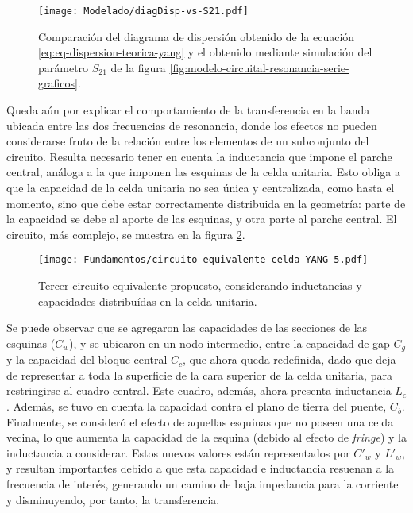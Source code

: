 \begin{figure}[h]
	\centering
	\texttt{[image: Modelado/diagDisp-vs-S21.pdf]}
	\caption{Comparación del diagrama de dispersión obtenido de la ecuación \ref{eq:eq-dispersion-teorica-yang} y el obtenido mediante simulación del parámetro $S_{21}$ de la figura \ref{fig:modelo-circuital-resonancia-serie-graficos}.}
	\label{fig:diagDisp-vs-S21}
\end{figure}


Queda aún por explicar el comportamiento de la transferencia en la banda ubicada entre las dos frecuencias de resonancia, donde los efectos no pueden considerarse fruto de la relación entre los elementos de un subconjunto del circuito. Resulta necesario tener en cuenta la inductancia que impone el parche central, análoga a la que imponen las esquinas de la celda unitaria. Esto obliga a que la capacidad de la celda unitaria no sea única y centralizada, como hasta el momento, sino que debe estar correctamente distribuida en la geometría: parte de la capacidad se debe al aporte de las esquinas, y otra parte al parche central. El circuito, más complejo, se muestra en la figura \ref{fig:modelo-circuital-todojunto-sinR}.

\begin{figure}[h]
	\centering
	\texttt{[image: Fundamentos/circuito-equivalente-celda-YANG-5.pdf]}
	\caption{Tercer circuito equivalente propuesto, considerando inductancias y capacidades distribuídas en la celda unitaria.}
	\label{fig:modelo-circuital-todojunto-sinR}
\end{figure}

Se puede observar que se agregaron las capacidades de las secciones de las esquinas ($C_w$), y se ubicaron en un nodo intermedio, entre la capacidad de gap $C_g$ y la capacidad del bloque central $C_c$, que ahora queda redefinida, dado que deja de representar a toda la superficie de la cara superior de la celda unitaria, para restringirse al cuadro central. Este cuadro, además, ahora presenta inductancia $L_c$. Además, se tuvo en cuenta la capacidad contra el plano de tierra del puente, $C_b$. Finalmente, se consideró el efecto de aquellas esquinas que no poseen una celda vecina, lo que aumenta la capacidad de la esquina (debido al efecto de \textit{fringe}) y la inductancia a considerar. Estos nuevos valores están representados por $C'_w$ y $L'_w$, y resultan importantes debido a que esta capacidad e inductancia resuenan a la frecuencia de interés, generando un camino de baja impedancia para la corriente y disminuyendo, por tanto, la transferencia.

